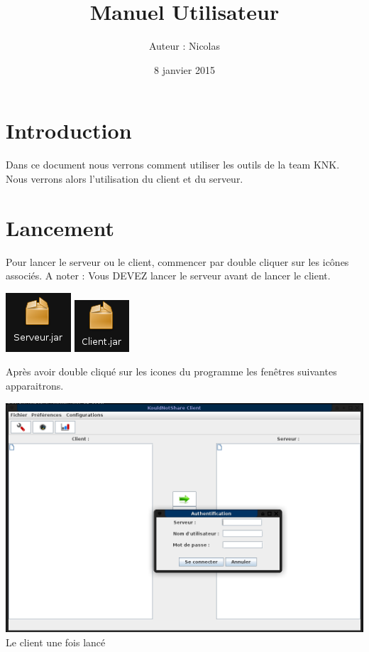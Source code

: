 \documentclass[12pt,a4paper]{article}
\title{Manuel Utilisateur}
\author{Auteur : Nicolas \bsc{REYNAUD}}
\date{8 janvier 2015}
\begin{document}
\maketitle

\newpage

\section{Introduction}

Dans ce document nous verrons comment utiliser les outils de la team KNK.\\

Nous verrons alors l'utilisation du client et du serveur.

\section{Lancement}

Pour lancer le serveur ou le client, commencer par double cliquer sur les icônes associés.
A noter : Vous DEVEZ lancer le serveur avant de lancer le client.

\includegraphics[scale=0.6]{images/serveur.png} 
\includegraphics[scale=0.7]{images/client.png}

Après avoir double cliqué sur les icones du programme les fenêtres suivantes apparaitrons. 

\begin{center}

\includegraphics[scale=0.3]{images/clientlance.png} \\
Le client une fois lancé

\end{center}
\end{document}
